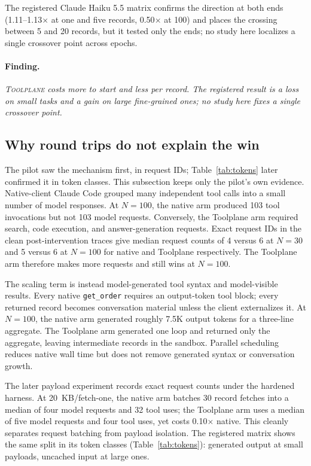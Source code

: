 \documentclass[10pt,twocolumn]{article}
\newcommand{\toolplane}{\textsc{Toolplane}\xspace}
\newcommand{\finding}[1]{\paragraph{Finding.} \emph{#1}}
\begin{document}
The registered Claude Haiku 5.5 matrix confirms the direction at both ends
(1.11--1.13$\times$ at one and five records, 0.50$\times$ at 100) and places the
crossing between 5 and 20 records, but it tested only the ends; no study here
localizes a single crossover point across epochs.

\finding{\toolplane costs more to start and less per record.  The registered result
is a loss on small tasks and a gain on large fine-grained ones; no study here
fixes a single crossover point.}

\subsection{Why round trips do not explain the win}

The pilot saw the mechanism first, in request IDs;
Table~\ref{tab:tokens} later confirmed it in token classes.  This subsection
keeps only the pilot's own evidence.
Native-client Claude Code grouped many independent tool calls into a small number of
model responses.  At $N=100$, the native arm produced 103 tool invocations but not 103
model requests.  Conversely, the Toolplane arm required search, code execution,
and answer-generation requests.  Exact request IDs in the clean
post-intervention traces give median request counts of 4 versus 6 at $N=30$
and 5 versus 6 at $N=100$ for native and Toolplane respectively.  The Toolplane arm
therefore makes more requests and still wins at $N=100$.

The scaling term is instead model-generated tool syntax and model-visible
results.  Every native \texttt{get\_order} requires an output-token tool block;
every returned record becomes conversation material unless the client
externalizes it.  At $N=100$, the native arm generated roughly 7.5K output tokens for a
three-line aggregate.  The Toolplane arm generated one loop and returned only the
aggregate, leaving intermediate records in the sandbox.  Parallel scheduling
reduces native wall time but does not remove generated syntax or conversation
growth.

The later payload experiment records exact request counts under the hardened
harness.  At 20~KB/fetch-one, the native arm batches 30 record fetches into a median of
four model requests and 32 tool uses; the Toolplane arm uses a median of five model
requests and four tool uses, yet costs 0.10$\times$ native.  This cleanly separates
request batching from payload isolation.  The registered matrix shows the
same split in its token classes (Table~\ref{tab:tokens}): generated output at
small payloads, uncached input at large ones.
\end{document}
